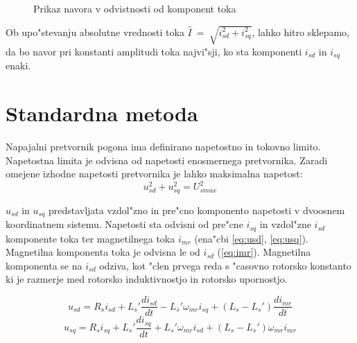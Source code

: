 \documentclass[journal,a4paper,twoside]{sty/IEEEtran}
\begin{document}
\begin{figure}
\caption{Prikaz navora v odvistnosti od komponent toka }
\label{fig:navor}
\end{figure}

Ob upo"stevanju absolutne vrednosti toka $\hat{I}~=~\sqrt{i_{sd}^2+i_{sq}^2}$, lahko hitro sklepamo, da bo navor pri konstanti amplitudi toka najvi"sji, ko sta komponenti $i_{sd}$ in $i_{sq}$ enaki.

\section{Standardna metoda}
\label{sec:stand}
Napajalni pretvornik pogona ima definirano napetostno in tokovno limito. Napetostna limita je odvisna od napetosti enosmernega pretvornika.\cite{vas}
Zaradi omejene izhodne napetosti pretvornika je lahko maksimalna napetost:
\begin{equation}
u_{sd}^2+u_{sq}^2= U_{smax}^2
\label{eq:napetostna_limita_osnovna}
\end{equation}

$u_{sd}$ in $u_{sq}$ predstavljata vzdol"zno in pre"cno komponento  napetosti v dvoosnem koordinatnem sistemu. Napetosti sta odvisni od pre"cne $i_{sq}$ in vzdol"zne $i_{sd}$ komponente toka ter magnetilnega  toka $i_{mr}$ (ena"cbi \ref{eq:usd}, \ref{eq:usq}). Magnetilna komponenta toka je odvisna le od $i_{sd}$ (\ref{eq:imr}). Magnetilna komponenta se na $i_{sd}$ odziva, kot "clen prvega reda s "casovno rotorsko konstanto ki je razmerje  med rotorsko induktivnostjo in rotorsko upornostjo.\cite{servopogoni}

\begin{equation}
u_{sd}= R_s i_{sd}+L_s' \frac{di_{sd}}{dt}- L_s' \omega_{mr} i_{sq}+(L_s-L_s')\frac{di_{mr}}{dt}
\label{eq:usd}
\end{equation}
\begin{equation}
u_{sq}= R_s i_{sq}+L_s' \frac{di_{sq}}{dt} + L_s' \omega_{mr}i_{sd}+(L_s-L_s')\omega_{mr}i_{mr}
\label{eq:usq}
\end{equation}
\end{document}
